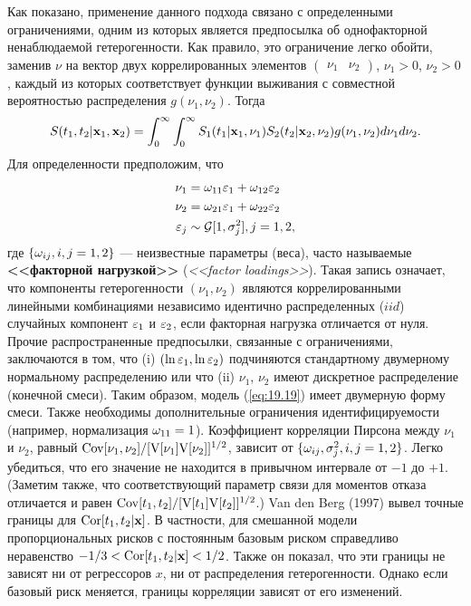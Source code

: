 Как показано, применение данного подхода связано с определенными ограничениями, одним из которых является предпосылка об однофакторной ненаблюдаемой гетерогенности. Как правило, это ограничение легко обойти, заменив $\nu$ на вектор двух коррелированных элементов $\begin{pmatrix} \nu_1 & \nu_2 \end{pmatrix}$, $\nu_1 > 0$, $\nu_2 > 0$, каждый из которых соответствует функции выживания с совместной вероятностью распределения $g(\nu_1, \nu_2)$. Тогда
    \begin{align}\label{eq:19.19}
    S(t_1, t_2|\mathbf{x}_1, \mathbf{x}_2) = \int^{\infty}_{0} \int^{\infty}_{0} S_1(t_1|\mathbf{x}_1, \nu_1) S_2(t_2|\mathbf{x}_2, \nu_2) g(\nu_1, \nu_2) d\nu_1 d\nu_2.
    \end{align}
Для определенности предположим, что
    \begin{align}
    \nu_1           &= \omega_{11}\varepsilon_1 + \omega_{12}\varepsilon_2 \notag \\
    \nu_2           &= \omega_{21}\varepsilon_1 + \omega_{22}\varepsilon_2 \notag \\
    \varepsilon_j   &\sim \mathcal G[1,\sigma^{2}_{j}] , j=1,2, \notag
    \end{align}
где $\{\omega_{ij}, i, j = 1, 2\}$ --- неизвестные параметры (веса), часто называемые \textbf{<<факторной нагрузкой>>} (\textit{<<factor loadings>>}). Такая запись означает, что компоненты гетерогенности $(\nu_1, \nu_2)$ являются коррелированными линейными комбинациями независимо идентично распределенных ($iid$) случайных компонент $\varepsilon_1$ и $\varepsilon_2$, если факторная нагрузка отличается от нуля. Прочие распространенные предпосылки, связанные с ограничениями, заключаются в том, что (i) $(\ln\varepsilon_1, \ln\varepsilon_2)$ подчиняются стандартному двумерному нормальному распределению или что (ii) $\nu_1$, $\nu_2$ имеют дискретное распределение (конечной смеси). Таким образом, модель (\ref{eq:19.19}) имеет двумерную форму смеси. Также необходимы дополнительные ограничения идентифицируемости (например, нормализация $\omega_{11} = 1$). Коэффициент корреляции Пирсона между $\nu_1$ и $\nu_2$, равный $\mathrm{Cov}[\nu_1, \nu_2]/[\mathrm{V}[\nu_1]\mathrm{V}[\nu_2]]^{1/2}$, зависит от $\{\omega_{ij}, \sigma^2_j, i, j = 1, 2\}$. Легко убедиться, что его значение не находится в привычном интервале от $-1$ до $+1$. (Заметим также, что соответствующий параметр связи для моментов отказа отличается и равен $\mathrm{Cov}[t_1, t_2]/[\mathrm{V}[t_1]\mathrm{V}[t_2]]^{1/2}$.) Van den Berg (1997) вывел точные границы для $\mathrm{Cor}[t_1, t_2|\mathbf{x}]$. В частности, для смешанной модели пропорциональных рисков с постоянным базовым риском справедливо неравенство $-1/3 < \mathrm{Cor}[t_1, t_2|\mathbf{x}] < 1/2$. Также он показал, что эти границы не зависят ни от регрессоров $x$, ни от распределения гетерогенности. Однако если базовый риск меняется, границы корреляции зависят от его изменений.

